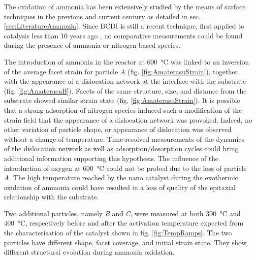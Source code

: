 The oxidation of ammonia has been extensively studied by the means of surface techniques in the previous and current century as detailed in sec. \ref{sec:LiteratureAmmonia}.
Since BCDI is still a recent technique, first applied to catalysis less than 10 years ago \parencite{Ulvestad2016}, no comparative measurements could be found during the presence of ammonia or nitrogen based species.

The introduction of ammonia in the reactor at \qty{600}{\degreeCelsius} was linked to an inversion of the average facet strain for particle \textit{A} (fig. \ref{fig:AmaterasuStrain}), together with the appearance of a dislocation network at the interface with the substrate (fig. \ref{fig:AmaterasuB}).
Facets of the same structure, size, and distance from the substrate showed similar strain state (fig. \ref{fig:AmaterasuStrain}).
It is possible that a strong adsorption of nitrogen species induced such a modification of the strain field that the appearance of a dislocation network was provoked.
Indeed, no other variation of particle shape, or appearance of dislocation was observed without a change of temperature.
Time-resolved measurements of the dynamics of the dislocation network as well as adsorption/desorption cycles could bring additional information supporting this hypothesis.
The influence of the introduction of oxygen at \qty{600}{\degreeCelsius} could not be probed due to the loss of particle \textit{A}.
The high temperature reached by the nano catalyst during the exothermic oxidation of ammonia \parencite{Hatscher2008} could have resulted in a loss of quality of the epitaxial relationship with the substrate.

Two additional particles, namely \textit{B} and \textit{C}, were measured at both \qty{300}{\degreeCelsius} and \qty{400}{\degreeCelsius}, respectively before and after the activation temperature expected from the characterisation of the catalyst shown in fig. \ref{fig:TempRamps}.
The two particles have different shape, facet coverage, and initial strain state.
They show different structural evolution during ammonia oxidation.

